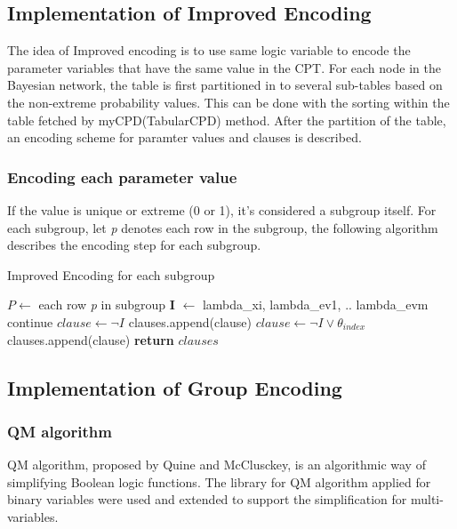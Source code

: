     \subsection{Implementation of Improved Encoding}
    The idea of Improved encoding is to use same logic variable to encode the parameter variables that have the same value in the CPT. For each node in the Bayesian network, the table is first partitioned in to several sub-tables based on the non-extreme probability values. This can be done with the sorting within the table fetched by myCPD(TabularCPD) method. After the partition of the table, an encoding scheme for paramter values and clauses is described.
    
    \subsubsection{Encoding each parameter value}
    If the value is unique or extreme (0 or 1), it's considered a subgroup itself. For each subgroup, let \textit{p} denotes each row in the subgroup, the following algorithm describes the encoding step for each subgroup.
    \begin{algorithm}
    \caption{Improved Encoding for each subgroup}\label{algorithm:encode group}
    \begin{algorithmic}[1]
    \State $P \gets$ each row \textit{p} in subgroup 
        \State \textbf{I} $\gets$ lambda\_xi, lambda\_ev1, .. lambda\_evm
                \State continue
            \EndIf
                \State $clause \gets \neg I$
                \State clauses.append(clause)
            \Else
                \State $clause \gets \neg I \vee \theta_{index}$
                \State clauses.append(clause)
            \EndIf
        \EndFor
    \EndFor
    \State \textbf{return} $clauses$
    \EndProcedure
    \end{algorithmic}
    \end{algorithm}
    \subsection{Implementation of Group Encoding}
    \subsubsection{QM algorithm}
    QM algorithm, proposed by Quine and McClusckey, is an algorithmic way of simplifying Boolean logic functions. The library for QM algorithm applied for binary variables were used and extended to support the simplification for multi-variables.
    
